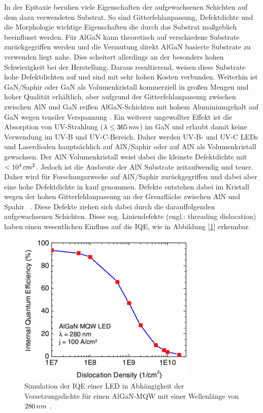 In der Epitaxie beruhen viele Eigenschaften der aufgewachsenen Schichten auf dem dazu verwendeten Substrat. So sind Gitterfehlanpassung, Defektdichte und die Morphologie wichtige Eigenschaften die durch das Substrat maßgeblich beeinflusst werden. Für AlGaN kann theoretisch auf verschiedene Substrate zurückgegriffen werden und die Vermutung direkt AlGaN basierte Substrate zu verwenden liegt nahe. Dies scheitert allerdings an der besonders hohen Schwierigkeit bei der Herstellung. Daraus resultierend, weisen diese Substrate hohe Defektdichten auf und sind mit sehr hohen Kosten verbunden. Weiterhin ist GaN/Saphir oder GaN als Volumenkristall kommerziell in großen Mengen und hoher Qualität erhältlich, aber aufgrund der Gitterfehlanpassung zwischen zwischen AlN und GaN reißen AlGaN-Schichten mit hohem Aluminiumgehalt auf GaN wegen tensiler Verspannung \cite{problem} . Ein weiterer ungewollter Effekt ist die Absorption von UV-Strahlung ($\lambda \leq 365 \thinspace nm$) im GaN und erlaubt damit keine Verwendung im UV-B und UV-C-Bereich. Daher werden UV-B- und UV-C LEDs und Laserdioden hauptsächlich auf AlN/Saphir oder auf AlN als Volumenkristall gewachsen. Der AlN Volumenkristall weist dabei die kleinste Defektdichte mit $<10^4 \thinspace cm^2$. Jedoch ist die Ausbeute der AlN Substrate zeitaufwendig und teuer. Daher wird für Forschungszwecke auf AlN/Saphir zurückgegriffen und dabei aber eine hohe Defektdichte in kauf genommen. Defekte entstehen dabei im Kristall wegen der hohen Gitterfehlanpassung an der Grenzfläche zwischen AlN und Spahir ~\cite{pohl}. Diese Defekte ziehen sich dabei durch die darauffolgenden aufgewachsenen Schichten. Diese sog. Liniendefekte (engl.: threading dislocation) haben einen wesentlichen Einfluss auf die IQE, wie in Abbildung [\ref{fig:IQEthreadingdisl}] erkennbar. 
%
\begin{figure}[h]
\centering
\begin{minipage}[t]{1\linewidth}
\centering
\includegraphics[width=0.5\linewidth]{Bilder/IQEthreadingdisl.png}
\end{minipage}%
\caption{Simulation der IQE einer LED in Abhängigkeit der Versetzungsdichte für einen AlGaN-MQW mit einer Wellenlänge von $280 \thinspace nm$ \cite{0268-1242-26-1-014036}.}
 \label{fig:IQEthreadingdisl}
\end{figure}
